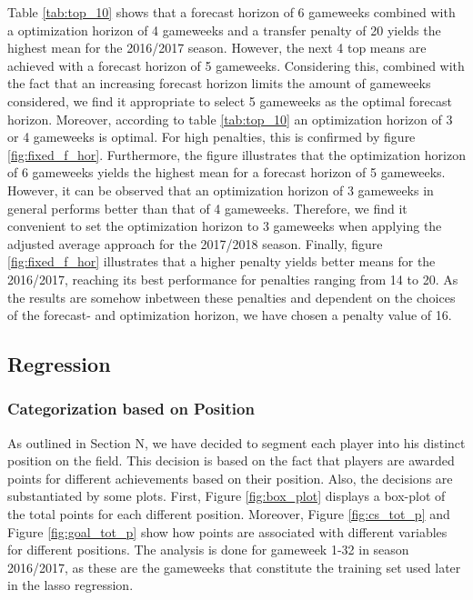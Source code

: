 Table \ref{tab:top_10} shows that a forecast horizon of 6 gameweeks combined with a optimization horizon of 4 gameweeks and a transfer penalty of 20 yields the highest mean for the 2016/2017 season. However, the next 4 top means are achieved with a forecast horizon of 5 gameweeks. Considering this, combined with the fact that an increasing forecast horizon limits the amount of gameweeks considered, we find it appropriate to select 5 gameweeks as the optimal forecast horizon. Moreover, according to table \ref{tab:top_10} an optimization horizon of 3 or 4 gameweeks is optimal. For high penalties, this is confirmed by figure \ref{fig:fixed_f_hor}. Furthermore, the figure illustrates that the optimization horizon of 6 gameweeks yields the highest mean for a forecast horizon of 5 gameweeks. However, it can be observed that an optimization horizon of 3 gameweeks in general performs better than that of 4 gameweeks. Therefore, we find it convenient to set the optimization horizon to 3 gameweeks when applying the adjusted average approach for the 2017/2018 season. Finally, figure \ref{fig:fixed_f_hor} illustrates that a higher penalty yields better means for the 2016/2017, reaching its best performance for penalties ranging from 14 to 20. As the results are somehow inbetween these penalties and dependent on the choices of the forecast- and optimization horizon, we have chosen a penalty value of 16. 

\subsection{Regression}

\subsubsection{Categorization based on Position}

As outlined in Section N, we have decided to segment each player into his distinct position on the field. This decision is based on the fact that players are awarded points for different achievements based on their position. Also, the decisions are substantiated by some plots. First, Figure \ref{fig:box_plot} displays a box-plot of the total points for each different position. Moreover, Figure \ref{fig:cs_tot_p} and Figure \ref{fig:goal_tot_p} show how points are associated with different variables for different positions. The analysis is done for gameweek 1-32 in season 2016/2017, as these are the gameweeks that constitute the training set used later in the lasso regression.


